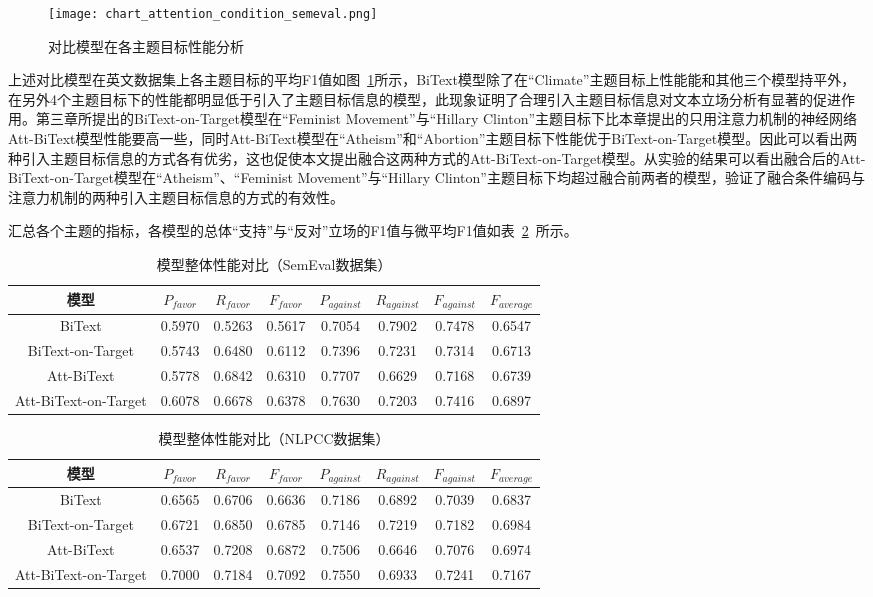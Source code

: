 \begin{figure}[htbp]
	\centering
	\texttt{[image: chart\_attention\_condition\_semeval.png]}
	\caption[rnn_vanish]{对比模型在各主题目标性能分析}
	\label{chart_attention_condition_semeval}
\end{figure}
上述对比模型在英文数据集上各主题目标的平均F1值如图~\ref{chart_attention_condition_semeval}所示，BiText模型除了在“Climate”主题目标上性能能和其他三个模型持平外，在另外4个主题目标下的性能都明显低于引入了主题目标信息的模型，此现象证明了合理引入主题目标信息对文本立场分析有显著的促进作用。第三章所提出的BiText-on-Target模型在“Feminist Movement”与“Hillary Clinton”主题目标下比本章提出的只用注意力机制的神经网络Att-BiText模型性能要高一些，同时Att-BiText模型在“Atheism”和“Abortion”主题目标下性能优于BiText-on-Target模型。因此可以看出两种引入主题目标信息的方式各有优劣，这也促使本文提出融合这两种方式的Att-BiText-on-Target模型。从实验的结果可以看出融合后的Att-BiText-on-Target模型在“Atheism”、“Feminist Movement”与“Hillary Clinton”主题目标下均超过融合前两者的模型，验证了融合条件编码与注意力机制的两种引入主题目标信息的方式的有效性。

汇总各个主题的指标，各模型的总体“支持”与“反对”立场的F1值与微平均F1值如表~\ref{semeval_all_model}~所示。
\begin{table}[htbp]
	\caption[table123]{模型整体性能对比（SemEval数据集）}
	\label{semeval_all_model}
	\vspace{0.5em}\centering\wuhao
	\begin{tabular}{cccccccc}
		\toprule[1.5pt]
		模型& $P_{favor}$&$R_{favor}$&$F_{favor}$&$P_{against}$&$R_{against}$&$F_{against}$&$F_{average}$ \\
		\midrule[1pt]
		BiText&0.5970&0.5263&0.5617&0.7054&0.7902&0.7478&0.6547\\
		BiText-on-Target&0.5743&0.6480&0.6112&0.7396&0.7231&0.7314&0.6713\\
		Att-BiText&0.5778&0.6842&0.6310&0.7707&0.6629&0.7168&0.6739\\
		Att-BiText-on-Target&0.6078&0.6678&0.6378&0.7630&0.7203&0.7416&0.6897\\
		\bottomrule[1.5pt]
	\end{tabular}
\end{table}

\begin{table}[htbp]
	\caption[table123]{模型整体性能对比（NLPCC数据集）}
	\label{semeval_all_model}
	\vspace{0.5em}\centering\wuhao
	\begin{tabular}{cccccccc}
		\toprule[1.5pt]
		模型& $P_{favor}$&$R_{favor}$&$F_{favor}$&$P_{against}$&$R_{against}$&$F_{against}$&$F_{average}$ \\
		\midrule[1pt]
		BiText&0.6565&0.6706&0.6636&0.7186&0.6892&0.7039&0.6837\\
		BiText-on-Target&0.6721&0.6850&0.6785&0.7146&0.7219&0.7182&0.6984\\
		Att-BiText&0.6537&0.7208&0.6872&0.7506&0.6646&0.7076&0.6974\\
		Att-BiText-on-Target&0.7000&0.7184&0.7092&0.7550&0.6933&0.7241&0.7167\\
		\bottomrule[1.5pt]
	\end{tabular}
\end{table}

